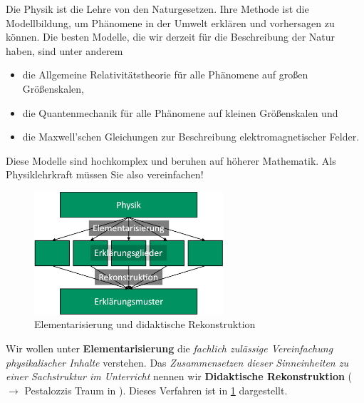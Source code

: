 Die Physik ist die Lehre von den Naturgesetzen. Ihre Methode ist die Modellbildung, um Phänomene in der Umwelt erklären und vorhersagen zu können. Die besten Modelle, die wir derzeit für die Beschreibung der Natur haben, sind unter anderem
\begin{itemize}
	\item die Allgemeine Relativitätstheorie für alle Phänomene auf großen Größenskalen,
	\item die Quantenmechanik für alle Phänomene auf kleinen Größenskalen und
	\item die Maxwell'schen Gleichungen zur Beschreibung elektromagnetischer Felder.
\end{itemize}
Diese Modelle sind hochkomplex und beruhen auf höherer Mathematik. Als Physiklehrkraft müssen Sie also vereinfachen!

\begin{figure}[ht b]
	\centering
	\includegraphics[width=7cm]{Bilder/elementarisierung}
	\caption{Elementarisierung und didaktische Rekonstruktion}\label{fig:elementarisierung}
\end{figure}

Wir wollen unter \textbf{Elementarisierung} die \emph{fachlich zulässige Vereinfachung physikalischer Inhalte} verstehen. Das \emph{Zusammensetzen dieser Sinneinheiten zu einer Sachstruktur im Unterricht} nennen wir \textbf{Didaktische Rekonstruktion} ($\to$ Pestalozzis Traum in \cite[S. 158 f.]{KircherGirwidzHaussler1}). Dieses Verfahren ist in \cref{fig:elementarisierung} dargestellt.
\vfill

